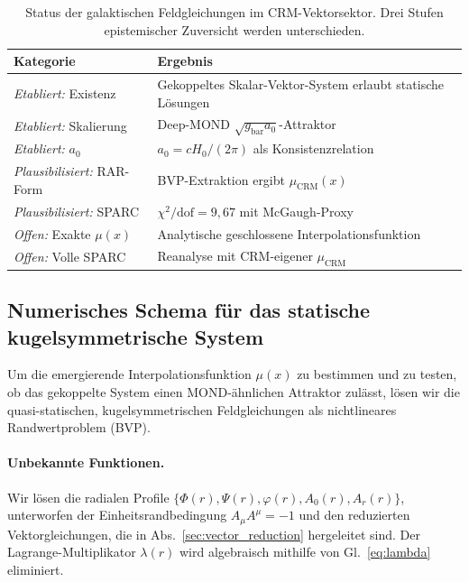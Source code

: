 \documentclass[aps,prd,twocolumn,superscriptaddress,nofootinbib]{revtex4-2}
\begin{document}
\begin{table}[tbp]
\caption{\label{tab:galactic_status}Status der galaktischen Feldgleichungen im CRM-Vektorsektor. Drei Stufen epistemischer Zuversicht werden unterschieden.}
\begin{ruledtabular}
\begin{tabular}{ll}
\textbf{Kategorie} & \textbf{Ergebnis} \\
\hline
\textit{Etabliert:} Existenz & Gekoppeltes Skalar-Vektor-System erlaubt statische L\"osungen \\
\textit{Etabliert:} Skalierung & Deep-MOND $\sqrt{g_{\mathrm{bar}} a_0}$-Attraktor \\
\textit{Etabliert:} $a_0$ & $a_0 = cH_0/(2\pi)$ als Konsistenzrelation \\
\hline
\textit{Plausibilisiert:} RAR-Form & BVP-Extraktion ergibt $\mu_{\mathrm{CRM}}(x)$ \\
\textit{Plausibilisiert:} SPARC & $\chi^2/\mathrm{dof} = 9{,}67$ mit McGaugh-Proxy \\
\hline
\textit{Offen:} Exakte $\mu(x)$ & Analytische geschlossene Interpolationsfunktion \\
\textit{Offen:} Volle SPARC & Reanalyse mit CRM-eigener $\mu_{\mathrm{CRM}}$ \\
\end{tabular}
\end{ruledtabular}
\end{table}

\subsection{Numerisches Schema f\"ur das statische kugelsymmetrische System}
\label{sec:numerical_scheme}

Um die emergierende Interpolationsfunktion $\mu(x)$ zu bestimmen und zu testen, ob das gekoppelte System einen MOND-\"ahnlichen Attraktor zul\"asst, l\"osen wir die quasi-statischen, kugelsymmetrischen Feldgleichungen als nichtlineares Randwertproblem (BVP).

\paragraph{Unbekannte Funktionen.}
Wir l\"osen die radialen Profile $\{\Phi(r), \Psi(r), \varphi(r), A_0(r), A_r(r)\}$, unterworfen der Einheitsrandbedingung $A_\mu A^\mu = -1$ und den reduzierten Vektorgleichungen, die in Abs.~\ref{sec:vector_reduction} hergeleitet sind. Der Lagrange-Multiplikator $\lambda(r)$ wird algebraisch mithilfe von Gl.~\eqref{eq:lambda} eliminiert.
\end{document}
